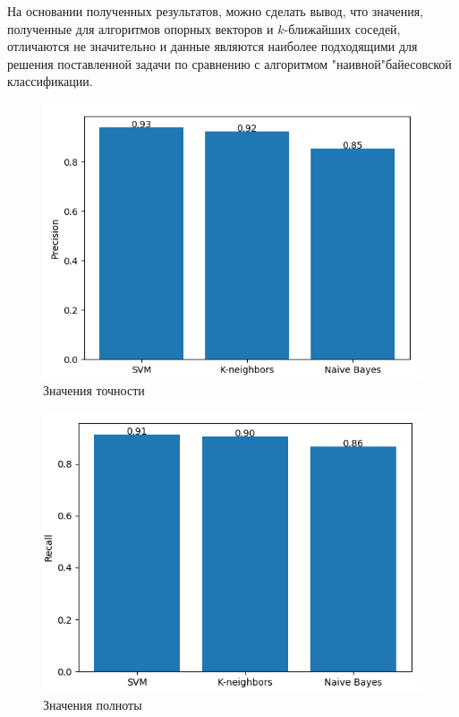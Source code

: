 На основании полученных результатов, можно сделать вывод, что значения, полученные для алгоритмов опорных векторов и $k$-ближайших соседей, отличаются не значительно и данные являются наиболее подходящими для решения поставленной задачи по сравнению с алгоритмом "наивной"\space байесовской классификации.

\newpage
\begin{figure}[h!]
	\centering
	\includegraphics[scale=0.7]{inc/img/precision.png}
	\caption{Значения точности}
	\label{res:precision}
\end{figure}


\begin{figure}[h!]
	\centering
	\includegraphics[scale=0.7]{inc/img/recall.png}
	\caption{Значения полноты}
	\label{res:recall}
\end{figure}

